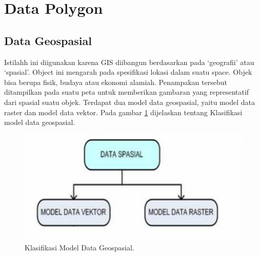 
\section{Data Polygon}
\subsection{Data Geospasial}
Istilahh ini diigunakan karena GIS diibangun berdasarkan pada ‘geografii’ atau ‘spasial’. Object ini mengarah pada spesifikasi lokasi dalam suatu space. Objek bisa berupa fisik, budaya atau ekonomi alamiah. Penampakan tersebut ditampilkan pada suatu peta untuk memberikan gambaran yang representatif dari spasial suatu objek.
Terdapat dua model data geospasial, yaitu model data raster dan model data vektor. 
Pada gambar \ref{datageospasial} dijelaskan tentang Klasifikasi model data geospasial.
\begin{figure}[ht]
	\centerline{\includegraphics[width=1\textwidth]{figures/datageospasial.JPG}}
	\caption{Klasifikasi Model Data Geospasial.}
	\label{datageospasial}
	\end{figure}

